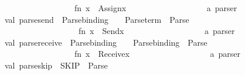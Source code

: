 \begin{isabellebody}
\ \ \ \ \ \ \ \ \ \ \ \ \ \ \ \ {\isachargreater}{\kern0pt}{\isachargreater}{\kern0pt}\ {\isacharparenleft}{\kern0pt}fn\ {\isacharparenleft}{\kern0pt}x{\isacharparenright}{\kern0pt}\ {\isacharequal}{\kern0pt}{\isachargreater}{\kern0pt}\ Assign{\isacharparenleft}{\kern0pt}x{\isacharparenright}{\kern0pt}{\isacharparenright}{\kern0pt}\isanewline
\ \ \ \ \ \ \ \ \ \ \ \ \ \ \ \ \ \ {\isacharcolon}{\kern0pt}\ a\ parser\isanewline
val\ parse{\isacharunderscore}{\kern0pt}send\ {\isacharequal}{\kern0pt}\ Parse{\isachardot}{\kern0pt}binding\ {\isacharminus}{\kern0pt}{\isacharminus}{\kern0pt}{\isacharbar}{\kern0pt}\ \isactrlkeyword {\isasymopen}{\isacharminus}{\kern0pt}{\isachargreater}{\kern0pt}{\isasymclose}\ {\isacharminus}{\kern0pt}{\isacharminus}{\kern0pt}\ Parse{\isachardot}{\kern0pt}term\ {\isacharminus}{\kern0pt}{\isacharminus}{\kern0pt}{\isacharbar}{\kern0pt}\ Parse{\isachardot}{\kern0pt}{\isachardollar}{\kern0pt}{\isachardollar}{\kern0pt}{\isachardollar}{\kern0pt}\ {\isachardoublequote}{\kern0pt}{\isacharsemicolon}{\kern0pt}{\isachardoublequote}{\kern0pt}\isanewline
\ \ \ \ \ \ \ \ \ \ \ \ \ \ \ \ \ {\isachargreater}{\kern0pt}{\isachargreater}{\kern0pt}\ {\isacharparenleft}{\kern0pt}fn\ {\isacharparenleft}{\kern0pt}x{\isacharparenright}{\kern0pt}\ {\isacharequal}{\kern0pt}{\isachargreater}{\kern0pt}\ Send{\isacharparenleft}{\kern0pt}x{\isacharparenright}{\kern0pt}{\isacharparenright}{\kern0pt}\isanewline
\ \ \ \ \ \ \ \ \ \ \ \ \ \ \ \ \ \ {\isacharcolon}{\kern0pt}\ a\ parser\isanewline
val\ parse{\isacharunderscore}{\kern0pt}receive\ {\isacharequal}{\kern0pt}\ Parse{\isachardot}{\kern0pt}binding\ {\isacharminus}{\kern0pt}{\isacharminus}{\kern0pt}{\isacharbar}{\kern0pt}\ \isactrlkeyword {\isasymopen}{\isacharless}{\kern0pt}{\isacharminus}{\kern0pt}{\isasymclose}\ {\isacharminus}{\kern0pt}{\isacharminus}{\kern0pt}\ Parse{\isachardot}{\kern0pt}binding\ {\isacharminus}{\kern0pt}{\isacharminus}{\kern0pt}{\isacharbar}{\kern0pt}\ Parse{\isachardot}{\kern0pt}{\isachardollar}{\kern0pt}{\isachardollar}{\kern0pt}{\isachardollar}{\kern0pt}\ {\isachardoublequote}{\kern0pt}{\isacharsemicolon}{\kern0pt}{\isachardoublequote}{\kern0pt}\isanewline
\ \ \ \ \ \ \ \ \ \ \ \ \ \ \ \ {\isachargreater}{\kern0pt}{\isachargreater}{\kern0pt}\ {\isacharparenleft}{\kern0pt}fn\ {\isacharparenleft}{\kern0pt}x{\isacharparenright}{\kern0pt}\ {\isacharequal}{\kern0pt}{\isachargreater}{\kern0pt}\ Receive{\isacharparenleft}{\kern0pt}x{\isacharparenright}{\kern0pt}{\isacharparenright}{\kern0pt}\isanewline
\ \ \ \ \ \ \ \ \ \ \ \ \ \ \ \ \ \ {\isacharcolon}{\kern0pt}\ a\ parser\isanewline
val\ parse{\isacharunderscore}{\kern0pt}skip\ {\isacharequal}{\kern0pt}\ \isactrlkeyword {\isasymopen}SKIP{\isasymclose}\ {\isacharbar}{\kern0pt}{\isacharminus}{\kern0pt}{\isacharminus}{\kern0pt}\ Parse{\isachardot}{\kern0pt}{\isachardollar}{\kern0pt}{\isachardollar}{\kern0pt}{\isachardollar}{\kern0pt}\ {\isachardoublequote}{\kern0pt}{\isacharsemicolon}{\kern0pt}{\isachardoublequote}{\kern0pt}\isanewline

\end{isabellebody}
